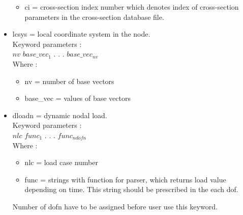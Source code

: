 \documentclass[12pt]{book}
\begin{document}
\begin{itemize}
\begin{itemize}
        \item ci = cross-section index number which denotes index of
             cross-section parameters in the cross-section database file.
        \end{itemize}
\item lcsys = local coordinate system in the node.\\
        Keyword parameters :\\
        $nv$ $base\_vec_1$ . . . $base\_vec_{nv}$\\
        Where :
        \begin{itemize}
        \item nv = number of base vectors
        \item base\_vec = values of base vectors
        \end{itemize}
\item dloadn = dynamic nodal load.\\
         Keyword parameters :\\
         $nlc$ $func_1$ . . . $func_{ndofn}$\\
         Where :
         \begin{itemize}
         \item nlc  = load case number
         \item func = strings with function for parser, which returns
                load value depending on time. This string should be
                prescribed in the each dof.
         \end{itemize}
         Number of dofn have to be assigned before user use this keyword.


\end{itemize}
\end{document}
